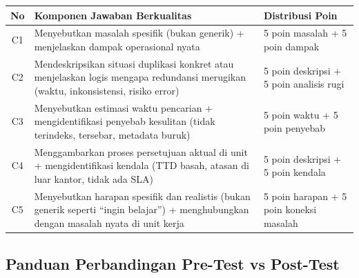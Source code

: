 \documentclass[12pt,a4paper]{report}
\begin{document}
\renewcommand{\arraystretch}{1.4}
\begin{center}
\begin{tabularx}{0.95\textwidth}{@{} c X X @{}}
\toprule
\textbf{No} & \textbf{Komponen Jawaban Berkualitas} & \textbf{Distribusi Poin} \\
\midrule
C1 & Menyebutkan masalah spesifik (bukan generik) + menjelaskan dampak operasional nyata & 5 poin masalah + 5 poin dampak \\
\hline
C2 & Mendeskripsikan situasi duplikasi konkret atau menjelaskan logis mengapa redundansi merugikan (waktu, inkonsistensi, risiko error) & 5 poin deskripsi + 5 poin analisis rugi \\
\hline
C3 & Menyebutkan estimasi waktu pencarian + mengidentifikasi penyebab kesulitan (tidak terindeks, tersebar, metadata buruk) & 5 poin waktu + 5 poin penyebab \\
\hline
C4 & Menggambarkan proses persetujuan aktual di unit + mengidentifikasi kendala (TTD basah, atasan di luar kantor, tidak ada SLA) & 5 poin deskripsi + 5 poin kendala \\
\hline
C5 & Menyebutkan harapan spesifik dan realistis (bukan generik seperti ``ingin belajar'') + menghubungkan dengan masalah nyata di unit kerja & 5 poin harapan + 5 poin koneksi masalah \\
\bottomrule
\end{tabularx}
\end{center}
\renewcommand{\arraystretch}{1.0}

\vspace{0.5cm}

\subsection{Panduan Perbandingan Pre-Test vs Post-Test}
\end{document}
